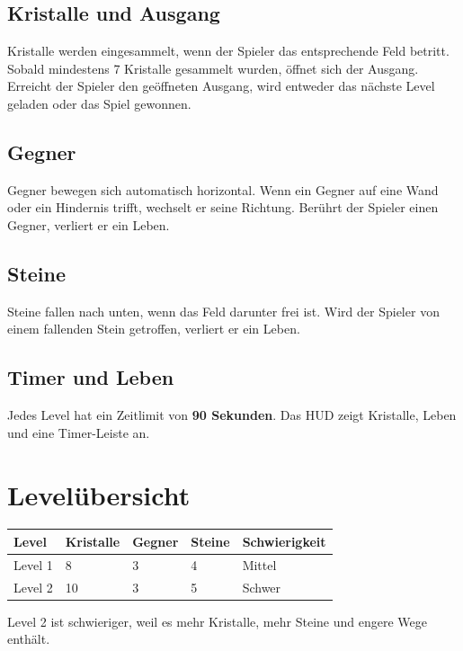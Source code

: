 \documentclass[12pt,a4paper]{article}
\begin{document}
\subsection{Kristalle und Ausgang}

Kristalle werden eingesammelt, wenn der Spieler das entsprechende Feld betritt. Sobald mindestens 7 Kristalle gesammelt wurden, öffnet sich der Ausgang. Erreicht der Spieler den geöffneten Ausgang, wird entweder das nächste Level geladen oder das Spiel gewonnen.

\subsection{Gegner}

Gegner bewegen sich automatisch horizontal. Wenn ein Gegner auf eine Wand oder ein Hindernis trifft, wechselt er seine Richtung. Berührt der Spieler einen Gegner, verliert er ein Leben.

\subsection{Steine}

Steine fallen nach unten, wenn das Feld darunter frei ist. Wird der Spieler von einem fallenden Stein getroffen, verliert er ein Leben.

\subsection{Timer und Leben}

Jedes Level hat ein Zeitlimit von \textbf{90 Sekunden}. Das HUD zeigt Kristalle, Leben und eine Timer-Leiste an.

\section{Levelübersicht}

\begin{longtable}{|p{3cm}|p{3cm}|p{3cm}|p{3cm}|p{3cm}|}
\hline
\textbf{Level} & \textbf{Kristalle} & \textbf{Gegner} & \textbf{Steine} & \textbf{Schwierigkeit} \\
\hline
Level 1 & 8 & 3 & 4 & Mittel \\
\hline
Level 2 & 10 & 3 & 5 & Schwer \\
\hline
\end{longtable}

Level 2 ist schwieriger, weil es mehr Kristalle, mehr Steine und engere Wege enthält.
\end{document}
